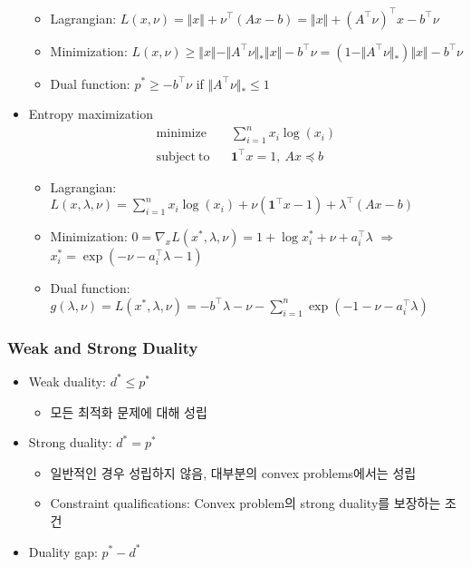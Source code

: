 \begin{itemize}
    \begin{itemize}
        \item Lagrangian: $L(x,\nu)=\Vert x\Vert+\nu^{\top}(Ax-b) = \Vert x\Vert + (A^{\top}\nu)^{\top}x - b^{\top}\nu$
        \item Minimization: $L(x,\nu)\geq\Vert x\Vert -\Vert A^{\top}\nu\Vert_\ast \Vert x\Vert - b^{\top}\nu = (1-\Vert A^{\top}\nu\Vert_\ast)\Vert x\Vert-b^{\top}\nu$
        \item Dual function: $p^\ast\geq-b^{\top}\nu$ if $\Vert A^{\top}\nu\Vert_\ast\leq 1$
    \end{itemize}
    \item Entropy maximization
    \begin{equation}\begin{aligned}
        \mathrm{minimize}~~&~~\sum_{i=1}^n x_i\log(x_i) \\
        \mathrm{subject~to}~~&~~\mathbf{1}^{\top}x = 1,~Ax\preceq b
    \end{aligned}\end{equation}
    \begin{itemize}
        \item Lagrangian: $L(x,\lambda,\nu)=\sum_{i=1}^nx_i\log(x_i)+\nu(\mathbf{1}^{\top}x-1)+\lambda^{\top}(Ax-b)$
        \item Minimization: $0 = \nabla_x L(x^\ast,\lambda,\nu)=1+\log x_i^\ast+\nu+a_i^{\top}\lambda$ $\Rightarrow$ $x_i^\ast=\exp(-\nu-a_i^{\top}\lambda - 1)$
        \item Dual function: $g(\lambda,\nu)=L(x^\ast,\lambda,\nu)=-b^{\top}\lambda-\nu-\sum_{i=1}^n\exp(-1-\nu-a_i^{\top}\lambda)$
    \end{itemize}
\end{itemize}
\newpage

\subsubsection*{Weak and Strong Duality}
\begin{itemize}
    \item Weak duality: $d^\ast\leq p^\ast$
    \begin{itemize}
        \item 모든 최적화 문제에 대해 성립
    \end{itemize}
    \item Strong duality: $d^\ast = p^\ast$
    \begin{itemize}
        \item 일반적인 경우 성립하지 않음, 대부분의 convex problems에서는 성립
        \item Constraint qualifications: Convex problem의 strong duality를 보장하는 조건
    \end{itemize}
    \item Duality gap: $p^\ast - d^\ast$
\end{itemize}

